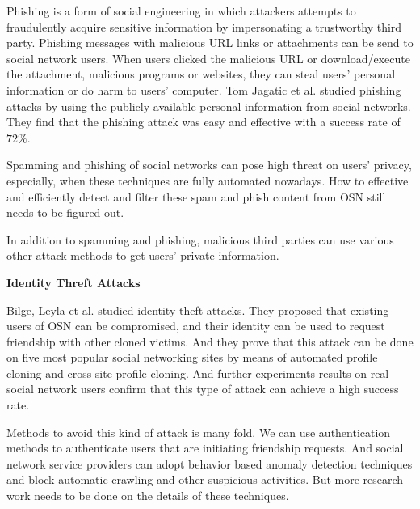 \documentclass[12pt]{article}
\begin{document}

Phishing is a form of social engineering in which attackers attempts
to fraudulently acquire sensitive information by impersonating a
trustworthy third party. Phishing messages with malicious URL links or
attachments can be send to social network users. When users clicked
the malicious URL or download/execute the attachment, malicious
programs or websites, they can steal users' personal information or do
harm to users' computer. Tom Jagatic et al. \cite{social-phishing}
studied phishing attacks by using the publicly available personal
information from social networks. They find that the phishing attack
was easy and effective with a success rate of $72\%$.

Spamming and phishing of social networks can pose high threat on
users' privacy, especially, when these techniques are fully automated 
nowadays\cite{SN-automated-cheap-spam}\cite{SN-explore-spam}. How to
effective and efficiently detect and filter these spam and phish
content from OSN still needs to be figured out.

In addition to spamming and phishing, malicious third parties can use
various other attack methods to get users' private information. 

\textbf{Identity Threft Attacks}

Bilge, Leyla et al.\cite{identity-theft-attack} studied identity
theft attacks. They proposed that existing users of OSN can be
compromised, and their identity can be used to request friendship with
other cloned victims. And they prove that this attack can be done on
five most popular social networking sites by means of automated
profile cloning and cross-site profile cloning. And further experiments
results on real social network users confirm that this type of attack
can achieve a high success rate. 

Methods to avoid this kind of attack is many fold. We can use
authentication methods to authenticate users that are initiating
friendship requests. And social network service providers 
can adopt behavior based anomaly detection techniques and block
automatic crawling and other suspicious activities. But more research
work needs to be done on the details of these techniques. 
\end{document}
